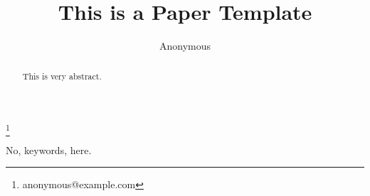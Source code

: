 \documentclass{entcs} \usepackage{entcsmacro}
\begin{document}
\begin{frontmatter}
	\title{This is a Paper Template}
	\author{Anonymous}
	\address{Anonymous Institution}
	\thanks[ALL]{anonymous@example.com}

	\begin{abstract}
		This is very abstract.
	\end{abstract}
	\begin{keyword}
		No, keywords, here.
	\end{keyword}
\end{frontmatter}

\pagestyle{empty}






\appendix

\end{document}
